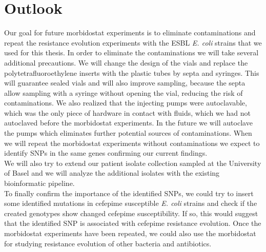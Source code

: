 \section{Outlook}
Our goal for future morbidostat experiments is to eliminate contaminations and repeat the resistance evolution experiments with the ESBL \textit{E. coli} strains that we used for this thesis. In order to eliminate the contaminations we will take several additional precautions. We will change the design of the vials and replace the polytetrafluoroethylene inserts with the plastic tubes by septa and syringes. This will guarantee sealed vials and will also improve sampling, because the septa allow sampling with a syringe without opening the vial, reducing the risk of contaminations. We also realized that the injecting pumps were autoclavable, which was the only piece of hardware in contact with fluids, which we had not autoclaved before the morbidostat experiments. In the future we will autoclave the pumps which eliminates further potential sources of contaminations. When we will repeat the morbidostat experiments without contaminations we expect to identify SNPs in the same genes confirming our current findings. \\
We will also try to extend our patient isolate collection sampled at the University of Basel and we will analyze the additional isolates with the existing bioinformatic pipeline.  \\
To finally confirm the importance of the identified SNPs, we could try to insert some identified mutations in cefepime susceptible \textit{E. coli} strains and check if the created genotypes show changed cefepime susceptibility. If so, this would suggest that the identified SNP is associated with cefepime resistance evolution. Once the morbidostat experiments have been repeated, we could also use the morbidostat for studying resistance evolution of other bacteria and antibiotics.